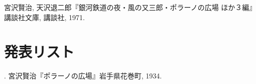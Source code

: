  \begin{thebibliography}{99}
	 宮沢賢治, 天沢退二郎『銀河鉄道の夜・風の又三郎・ポラーノの広場 ほか３編』
                           講談社文庫, 講談社, 1971.
 \end{thebibliography}


 \newpage

 \section*{\Large 発表リスト}
 \noindent [1] . 宮沢賢治『ポラーノの広場』岩手県花巻町, 1934.